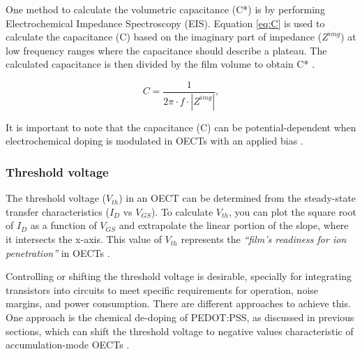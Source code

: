 One method to calculate the volumetric capacitance (C*) is by performing Electrochemical Impedance Spectroscopy (EIS). Equation \ref{eq:C} is used to calculate the capacitance (C) based on the imaginary part of impedance ($Z^{img}$) at low frequency ranges where the capacitance should describe a plateau. %
The calculated capacitance is then divided by the film volume to obtain C* %
 \cite{ohayonGuideCharacterizationOrganic2023}.

\begin{equation} \label{eq:C}
	C = \frac{1}{2\pi \cdot f \cdot |Z^{img}|},
\end{equation}

It is important to note that the capacitance (C) can be potential-dependent when electrochemical doping is modulated in OECTs with an applied bias %
\cite{inalBenchmarkingOrganicMixed2017}.

\subsubsection{Threshold voltage}

The threshold voltage ($V_{th}$) in an OECT can be determined from the steady-state transfer characteristics ($I_{D}$ vs $V_{GS}$). To calculate $V_{th}$, you can plot the square root of $I_{D}$ as a function of $V_{GS}$ and extrapolate the linear portion of the slope, where it intersects the x-axis. This value of $V_{th}$ represents the \textit{``film's readiness for ion penetration''} in OECTs \cite{ohayonGuideCharacterizationOrganic2023}.

Controlling or shifting the threshold voltage is desirable, specially for integrating transistors into circuits to meet specific requirements for operation, noise margins, and power consumption. There are different approaches to achieve this. One approach is the chemical de-doping of PEDOT:PSS, as discussed in previous sections, which can shift the threshold voltage to negative values characteristic of accumulation-mode OECTs \cite{keeneEnhancementModePEDOTPSS2020}. 

